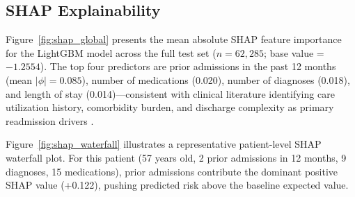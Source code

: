 \documentclass[11pt,letterpaper]{article}
\begin{document}
\subsection{SHAP Explainability}

Figure~\ref{fig:shap_global} presents the mean absolute SHAP feature importance for the LightGBM model across the full test set ($n = 62{,}285$; base value = $-1.2554$). The top four predictors are prior admissions in the past 12 months (mean $|\phi| = 0.085$), number of medications (0.020), number of diagnoses (0.018), and length of stay (0.014)---consistent with clinical literature identifying care utilization history, comorbidity burden, and discharge complexity as primary readmission drivers \citep{kansagara2011risk,frizzell2017prediction}.

Figure~\ref{fig:shap_waterfall} illustrates a representative patient-level SHAP waterfall plot. For this patient (57 years old, 2 prior admissions in 12 months, 9 diagnoses, 15 medications), prior admissions contribute the dominant positive SHAP value (+0.122), pushing predicted risk above the baseline expected value.
\end{document}
